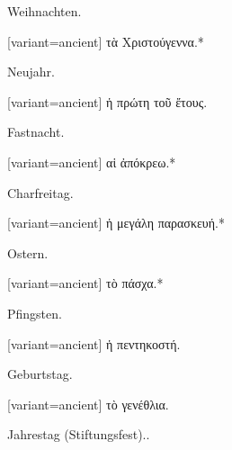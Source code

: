 Weihnachten.

\switchcolumn

\begin{greek}[variant=ancient]%
τὰ Χριστούγεννα.{*}

\end{greek}%
\switchcolumn*

Neujahr.

\switchcolumn

\begin{greek}[variant=ancient]%
ἡ πρώτη τοῦ ἔτους.

\end{greek}%
\switchcolumn*

Fastnacht.

\switchcolumn

\begin{greek}[variant=ancient]%
αἱ ἀπόκρεω.{*}

\end{greek}%
\switchcolumn*

Charfreitag.

\switchcolumn

\begin{greek}[variant=ancient]%
ἡ μεγάλη παρασκευή.{*}

\end{greek}%
\switchcolumn*

Ostern.

\switchcolumn

\begin{greek}[variant=ancient]%
τὸ πάσχα.{*}

\end{greek}%
\switchcolumn*

Pfingsten.

\switchcolumn

\begin{greek}[variant=ancient]%
ἡ πεντηκοστή.

\end{greek}%
\switchcolumn*

Geburts\textcompwordmark{}tag.

\switchcolumn

\begin{greek}[variant=ancient]%
τὸ γενέθλια.

\end{greek}%
\switchcolumn*

Jahres\textcompwordmark{}tag (Stiftungs\textcompwordmark{}fest)..

\switchcolumn

